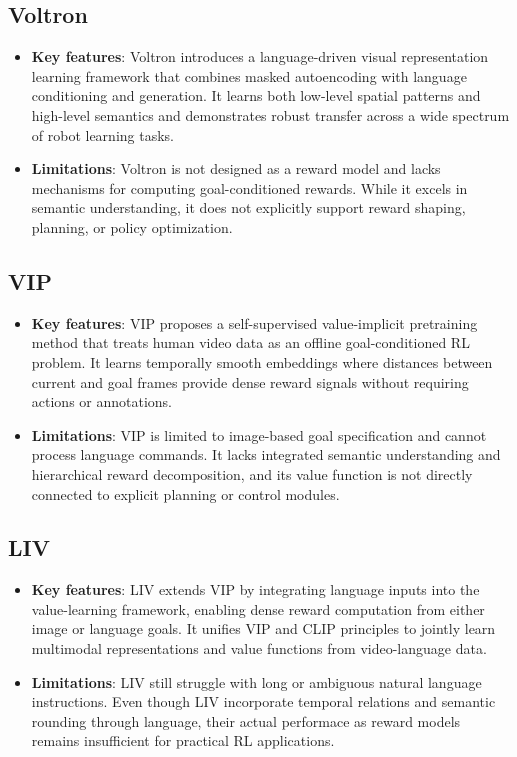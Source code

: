 \documentclass[11pt]{article}
\begin{document}
\subsection{Voltron}
\begin{itemize}
    \item \textbf{Key features}: Voltron \cite{voltron} introduces a language-driven visual representation learning framework that combines masked autoencoding with language conditioning and generation. It learns both low-level spatial patterns and high-level semantics and demonstrates robust transfer across a wide spectrum of robot learning tasks.
    
    \item \textbf{Limitations}: Voltron is not designed as a reward model and lacks mechanisms for computing goal-conditioned rewards. While it excels in semantic understanding, it does not explicitly support reward shaping, planning, or policy optimization.
\end{itemize}

\subsection{VIP}
\begin{itemize}
    \item \textbf{Key features}: VIP \cite{vip} proposes a self-supervised value-implicit pretraining method that treats human video data as an offline goal-conditioned RL problem. It learns temporally smooth embeddings where distances between current and goal frames provide dense reward signals without requiring actions or annotations.
    
    \item \textbf{Limitations}: VIP is limited to image-based goal specification and cannot process language commands. It lacks integrated semantic understanding and hierarchical reward decomposition, and its value function is not directly connected to explicit planning or control modules.
\end{itemize}

\subsection{LIV}
\begin{itemize}
    \item \textbf{Key features}: LIV \cite{liv} extends VIP by integrating language inputs into the value-learning framework, enabling dense reward computation from either image or language goals. It unifies VIP and CLIP principles to jointly learn multimodal representations and value functions from video-language data.
    
    \item \textbf{Limitations}: LIV still struggle with long or ambiguous natural language instructions. Even though LIV incorporate temporal relations and semantic rounding through language, their actual performace as reward models remains insufficient for practical RL applications.
\end{itemize}
\end{document}
